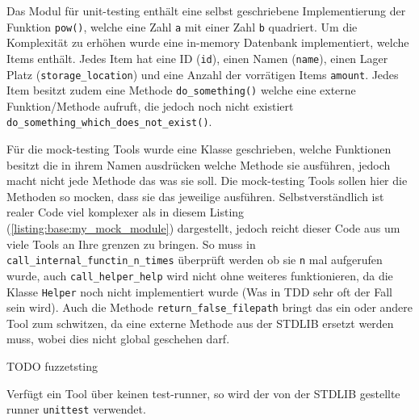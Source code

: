 Das Modul für unit-testing enthält eine selbst geschriebene Implementierung der Funktion \lstinline|pow()|,
welche eine Zahl \lstinline|a| mit einer Zahl \lstinline|b| quadriert. Um die Komplexität
zu erhöhen wurde eine in-memory Datenbank implementiert, welche Items enthält. Jedes Item 
hat eine ID (\lstinline|id|), einen Namen (\lstinline|name|), einen Lager Platz
(\lstinline|storage_location|) und eine Anzahl der vorrätigen Items \lstinline|amount|.
Jedes Item besitzt zudem eine Methode \lstinline|do_something()| welche eine externe
Funktion/Methode aufruft, die jedoch noch nicht existiert
\lstinline|do_something_which_does_not_exist()|.

Für die \gls{mock}-testing Tools wurde eine Klasse geschrieben, welche Funktionen besitzt
die in ihrem Namen ausdrücken welche Methode sie ausführen, jedoch macht nicht jede Methode
das was sie soll. Die \gls{mock}-testing Tools sollen hier die Methoden so \gls{mock}en, dass
sie das jeweilige ausführen. Selbstverständlich ist realer Code viel komplexer als in diesem
Listing (\ref{listing:base:my_mock_module}) dargestellt, jedoch reicht dieser Code aus um viele
Tools an Ihre grenzen zu bringen. So muss in \lstinline{call_internal_functin_n_times} überprüft
werden ob sie \lstinline{n} mal aufgerufen wurde, auch \lstinline{call_helper_help} wird nicht
ohne weiteres funktionieren, da die Klasse \lstinline{Helper} noch nicht implementiert wurde
(Was in TDD sehr oft der Fall sein wird). Auch die Methode \lstinline{return_false_filepath}
bringt das ein oder andere Tool zum schwitzen, da eine externe Methode aus der STDLIB ersetzt
werden muss, wobei dies nicht global geschehen darf.

TODO fuzzetsting

Verfügt ein Tool über keinen test-runner, so wird der von der STDLIB gestellte runner
\lstinline{unittest} verwendet.





